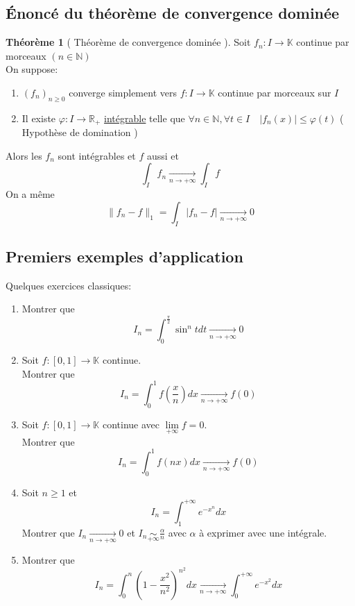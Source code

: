\documentclass[10pt,a4paper]{article}
\theoremstyle{definition}
\newtheorem{theorem}[proposition]{Théorème}
\begin{document}
\subsection{Énoncé du théorème de convergence dominée}
\begin{theorem}[ Théorème de convergence dominée ]
    Soit \(f_n: I \to \mathbb{K}\) continue par morceaux \((n \in \mathbb{N})\) \\
    On suppose:
    \begin{enumerate}
        \item \((f_n)_{n \geq 0}\) converge simplement vers \(f: I \to \mathbb{K}\) continue par morceaux sur \(I\)
        \item Il existe \(\varphi: I \to \mathbb{R}_+\) \uline{intégrable} telle que \(\forall n \in \mathbb{N}, \forall t \in I \quad |f_n(x)| \leq \varphi(t)\) ( Hypothèse de domination )
    \end{enumerate}
    Alors les \(f_n\) sont intégrables et \(f\) aussi et
    \[\boxed{\int_{I}f_n \xrightarrow[n \to +\infty]{} \int_{I}f}\]
    On a même
    \[\lVert f_n - f \rVert_1 = \int_{I}|f_n - f| \xrightarrow[n \to +\infty]{} 0\]
\end{theorem}

\subsection{Premiers exemples d'application}
\noindent Quelques exercices classiques:
\begin{enumerate}
    \item Montrer que \[I_n = \int_{0}^{\frac{\pi}{2}} \sin^{n}t dt \xrightarrow[n \to +\infty]{} 0\]
    \item Soit \(f: [0, 1] \to \mathbb{K}\) continue. \\ Montrer que \[I_n = \int_{0}^{1} f\left(\frac{x}{n}\right) dx \xrightarrow[n \to +\infty]{} f(0)\]
    \item Soit \(f: [0, 1] \to \mathbb{K}\) continue avec \(\lim\limits_{+\infty}f = 0\). \\ Montrer que \[I_n = \int_{0}^{1} f(nx) dx \xrightarrow[n \to +\infty]{} f(0)\]
    \item Soit \(n \geq 1\) et \[I_n = \int_{1}^{+\infty}e^{-x^{n}} dx\] Montrer que \(I_n \xrightarrow[n \to +\infty]{} 0\) et \(I_n \underset{+\infty}{\sim} \frac{\alpha}{n}\) avec \(\alpha\) à exprimer avec une intégrale.
    \item Montrer que \[I_n = \int_{0}^{n}\left(1 - \frac{x^2}{n^2}\right)^{n^2} dx \xrightarrow[n \to +\infty]{} \int_{0}^{+\infty}e^{-x^2} dx\]
\end{enumerate}
\end{document}

